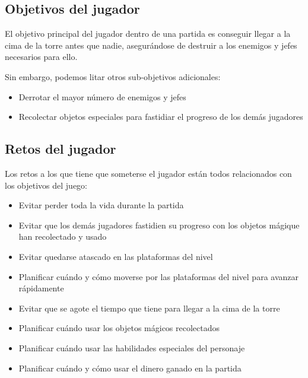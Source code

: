 \subsection{Objetivos del jugador}
El objetivo principal del jugador dentro de una partida es conseguir llegar a la
cima de la torre antes que nadie, asegurándose de destruir a los enemigos y
jefes necesarios para ello.

Sin embargo, podemos litar otros sub-objetivos adicionales:
\begin{itemize}
    \item Derrotar el mayor número de enemigos y jefes
    \item Recolectar objetos especiales para fastidiar el progreso de los demás
    jugadores
\end{itemize}

\subsection{Retos del jugador}

Los retos a los que tiene que someterse el jugador están todos relacionados con
los objetivos del juego:
\begin{itemize}
    \item Evitar perder toda la vida durante la partida
    \item Evitar que los demás jugadores fastidien su progreso con los objetos
    mágique han recolectado y usado
    \item Evitar quedarse atascado en las plataformas del nivel
    \item Planificar cuándo y cómo moverse por las plataformas del nivel para
    avanzar rápidamente
    \item Evitar que se agote el tiempo que tiene para llegar a la cima de la
    torre
    \item Planificar cuándo usar los objetos mágicos recolectados
    \item Planificar cuándo usar las habilidades especiales del personaje
    \item Planificar cuándo y cómo usar el dinero ganado en la partida
\end{itemize}